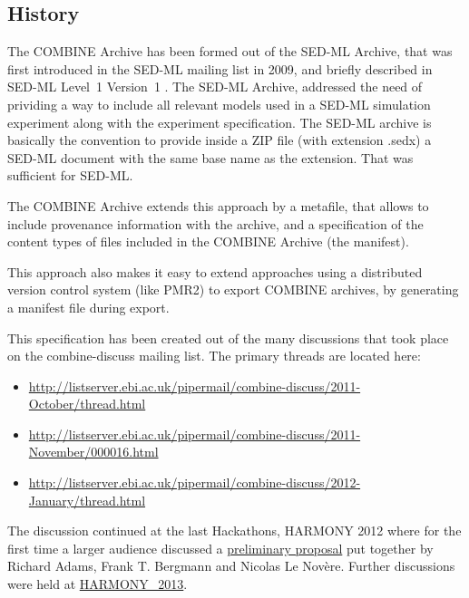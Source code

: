 

\subsection{History}
The COMBINE Archive has been formed out of the SED-ML Archive, that was 
first introduced in the SED-ML mailing list in 2009, and briefly described
in SED-ML Level~1 Version~1 \cite{sedmll1v1}. The SED-ML Archive, addressed the need of 
prividing a way to include all relevant models used in a SED-ML simulation
experiment along with the experiment specification. The SED-ML archive is 
basically the convention to provide inside a ZIP file (with extension .sedx)
a SED-ML document with the same base name as the extension. That was sufficient 
for SED-ML. 

The COMBINE Archive extends this approach by a metafile, that allows to include 
provenance information with the archive, and a specification of the content types
of files included in the COMBINE Archive (the manifest). 

This approach also makes it easy to extend approaches using a distributed version 
control system (like PMR2) to export COMBINE archives, by generating a manifest file
during export. 

This specification has been created out of the many discussions that took place
on the combine-discuss mailing list. The primary threads are located here: 

\begin{itemize}
	\item \href{http://listserver.ebi.ac.uk/pipermail/combine-discuss/2011-October/thread.html}{http://listserver.ebi.ac.uk/pipermail/combine-discuss/2011-October/thread.html}
	\item \href{http://listserver.ebi.ac.uk/pipermail/combine-discuss/2011-November/000016.html}{http://listserver.ebi.ac.uk/pipermail/combine-discuss/2011-November/000016.html}
	\item \href{http://listserver.ebi.ac.uk/pipermail/combine-discuss/2012-January/thread.html}{http://listserver.ebi.ac.uk/pipermail/combine-discuss/2012-January/thread.html}
\end{itemize}

The discussion continued at the last Hackathons, HARMONY 2012 where
for the first time a larger audience discussed a \href{https://docs.google.com/document/d/10tI1NwehBVDTxE5Q11APx7bZVoeNVJdFMiBdPywZKZM/edit}{preliminary proposal} put together by Richard Adams, Frank T. Bergmann and Nicolas Le Nov\`{e}re.  
Further discussions were held at \href{https://docs.google.com/document/d/1ji2mOiWzXXl9ON6sU6Svd3E_IufowUCz24hklqci0iM/edit}{HARMONY\_2013}. 
